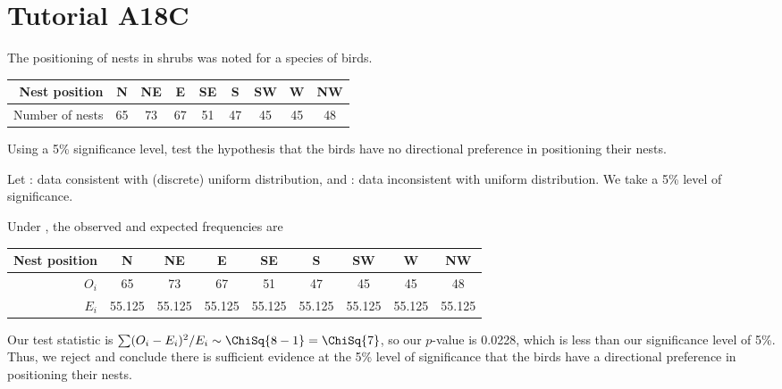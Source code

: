\section{Tutorial A18C}

\begin{problem}
    The positioning of nests in shrubs was noted for a species of birds.
    
    \begin{table}[H]
        \centering
        \begin{tabular}{|r|c|c|c|c|c|c|c|c|}
        \hline
        Nest position & N & NE & E & SE & S & SW & W & NW \\ \hline
        Number of nests & 65 & 73 & 67 & 51 & 47 & 45 & 45 & 48 \\ \hline
        \end{tabular}
    \end{table}

    Using a 5\% significance level, test the hypothesis that the birds have no directional preference in positioning their nests.
\end{problem}
\begin{solution}
    Let \nullhyp: data consistent with (discrete) uniform distribution, and \althyp: data inconsistent with  uniform distribution. We take a 5\% level of significance.

    Under \nullhyp, the observed and expected frequencies are
    \begin{table}[H]
        \centering
        \begin{tabular}{|r|c|c|c|c|c|c|c|c|}
        \hline
        Nest position & N & NE & E & SE & S & SW & W & NW \\ \hline
        $O_i$ & 65 & 73 & 67 & 51 & 47 & 45 & 45 & 48 \\ \hline
        $E_i$ & 55.125 & 55.125 & 55.125 & 55.125 & 55.125 & 55.125 & 55.125 & 55.125 \\ \hline
        \end{tabular}
    \end{table}

    Our test statistic is $\sum (O_i - E_i)^2 / E_i \sim \ChiSq{8-1} = \ChiSq{7}$, so our $p$-value is 0.0228, which is less than our significance level of 5\%. Thus, we reject \nullhyp{} and conclude there is sufficient evidence at the 5\% level of significance that the birds have a directional preference in positioning their nests.
\end{solution}

